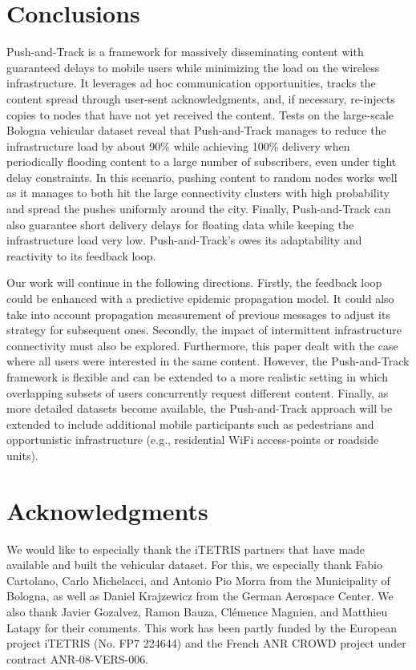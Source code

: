 \documentclass[preprint]{elsarticle}
\begin{document}
\section{Conclusions}
\label{sec:conclusion}

Push-and-Track is a framework for massively disseminating content with guaranteed delays to mobile users while minimizing the load on the wireless infrastructure. It leverages ad hoc communication opportunities, tracks the content spread through user-sent acknowledgments, and, if necessary, re-injects copies to nodes that have not yet received the content. Tests on the large-scale Bologna vehicular dataset reveal that Push-and-Track manages to reduce the infrastructure load by about 90\% while achieving 100\% delivery when periodically flooding content to a large number of subscribers, even under tight delay constraints. In this scenario, pushing content to random nodes works well as it manages to both hit the large connectivity clusters with high probability and spread the pushes uniformly around the city. Finally, Push-and-Track can also guarantee short delivery delays for floating data while keeping the infrastructure load very low. Push-and-Track's owes its adaptability and reactivity to its feedback loop.

Our work will continue in the following directions. Firstly, the feedback loop could be enhanced with a predictive epidemic propagation model. It could also take into account propagation measurement of previous messages to adjust its strategy for subsequent ones. Secondly, the impact of intermittent infrastructure connectivity must also be explored. Furthermore, this paper dealt with the case where all users were interested in the same content. However, the Push-and-Track framework is flexible and can be extended to a more realistic setting in which overlapping subsets of users concurrently request different content. Finally, as more detailed datasets become available, the Push-and-Track approach will be extended to include additional mobile participants such as pedestrians and opportunistic infrastructure (e.g., residential WiFi access-points or roadside units).

\section*{Acknowledgments}
We would like to especially thank the iTETRIS partners that have made available and built the vehicular dataset. For this, we especially thank Fabio Cartolano, Carlo Michelacci, and Antonio Pio Morra from the Municipality of Bologna, as well as Daniel Krajzewicz from the German Aerospace Center. We also thank Javier Gozalvez, Ramon Bauza, Cl\'emence Magnien, and Matthieu Latapy for their comments.
This work has been partly funded by the European project iTETRIS (No. FP7 224644) and the French ANR CROWD project under contract ANR-08-VERS-006.
\end{document}
